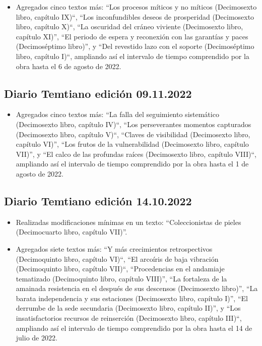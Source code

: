 \documentclass[
]{book}
\providecommand{\tightlist}{%
  \setlength{\itemsep}{0pt}\setlength{\parskip}{0pt}}
\begin{document}
\begin{itemize}
\tightlist
\item
  Agregados cinco textos más: ``Los procesos míticos y no míticos (Decimosexto libro, capítulo IX)``, ``Los inconfundibles deseos de prosperidad (Decimosexto libro, capítulo X)``, ``La oscuridad del cráneo viviente (Decimosexto libro, capítulo XI)'', ``El periodo de espera y reconexión con las garantías y paces (Decimoséptimo libro)'', y ``Del revestido lazo con el soporte (Decimoséptimo libro, capítulo I)``, ampliando así el intervalo de tiempo comprendido por la obra hasta el 6 de agosto de 2022.
\end{itemize}

\hypertarget{diario-temtiano-ediciuxf3n-09.11.2022}{%
\subsection*{Diario Temtiano edición 09.11.2022}\label{diario-temtiano-ediciuxf3n-09.11.2022}}

\begin{itemize}
\tightlist
\item
  Agregados cinco textos más: ``La falla del seguimiento sistemático (Decimosexto libro, capítulo IV)``, ``Los perseverantes momentos capturados (Decimosexto libro, capítulo V)``, ``Claves de visibilidad (Decimosexto libro, capítulo VI)'', ``Los frutos de la vulnerabilidad (Decimosexto libro, capítulo VII)'', y ``El calco de las profundas raíces (Decimosexto libro, capítulo VIII)``, ampliando así el intervalo de tiempo comprendido por la obra hasta el 1 de agosto de 2022.
\end{itemize}

\hypertarget{diario-temtiano-ediciuxf3n-14.10.2022}{%
\subsection*{Diario Temtiano edición 14.10.2022}\label{diario-temtiano-ediciuxf3n-14.10.2022}}

\begin{itemize}
\item
  Realizadas modificaciones mínimas en un texto: ``Coleccionistas de pieles (Decimocuarto libro, capítulo VII)''.
\item
  Agregados siete textos más: ``Y más crecimientos retrospectivos (Decimoquinto libro, capítulo VI)``, ``El arcoíris de baja vibración (Decimoquinto libro, capítulo VII)``, ``Procedencias en el andamiaje tematizado (Decimoquinto libro, capítulo VIII)'', ``La fortaleza de la amainada resistencia en el después de sus descensos (Decimosexto libro)'', ``La barata independencia y sus estaciones (Decimosexto libro, capítulo I)'', ``El derrumbe de la sede secundaria (Decimosexto libro, capítulo II)'', y ``Los insatisfactorios recursos de reinserción (Decimosexto libro, capítulo III)``, ampliando así el intervalo de tiempo comprendido por la obra hasta el 14 de julio de 2022.
\end{itemize}
\end{document}
